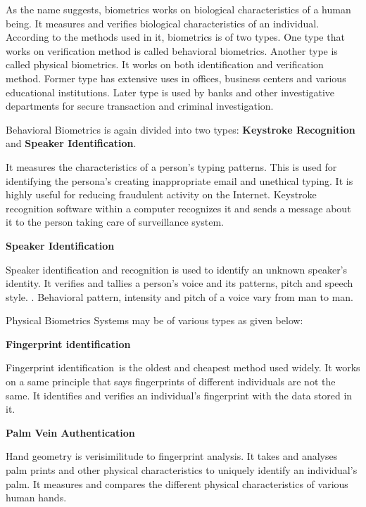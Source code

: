 \documentclass{article} %
\begin{document}
\noindent As the name suggests, biometrics works on biological characteristics of a human being. It measures and verifies biological characteristics of an individual. According to the methods used in it, biometrics is of two types. One type that works on verification method is called behavioral biometrics. Another type is called physical biometrics. It works on both identification and verification method. Former type has extensive uses in offices, business centers and various educational institutions. Later type is used by banks and other investigative departments for secure transaction and criminal investigation.

\noindent Behavioral Biometrics is again divided into two types: \textbf{Keystroke Recognition} and \textbf{Speaker Identification}.~~

\noindent It measures the characteristics of a person's typing patterns. This is used for identifying the persona's creating inappropriate email and unethical typing. It is highly useful for reducing fraudulent activity on the Internet. Keystroke recognition software within a computer recognizes it and sends a message about it to the person taking care of surveillance system.

\noindent \textbf{Speaker Identification}

\noindent Speaker identification and recognition is used to identify an unknown speaker's identity. It verifies and tallies a person's voice and its patterns, pitch and speech style. . Behavioral pattern, intensity and pitch of a voice vary from man to man.

\noindent Physical Biometrics Systems may be of various types as given below:

\noindent 

\noindent \textbf{Fingerprint identification}

\noindent Fingerprint identification~is the oldest and cheapest method used widely. It works on a same principle that says fingerprints of different individuals are not the same. It identifies and verifies an individual's fingerprint with the data stored in it.

\noindent \textbf{}

\noindent \textbf{Palm Vein Authentication}

\noindent Hand geometry is verisimilitude to fingerprint analysis. It takes and analyses palm prints and other physical characteristics to uniquely identify an individual's palm. It measures and compares the different physical characteristics of various human hands.
\end{document}

